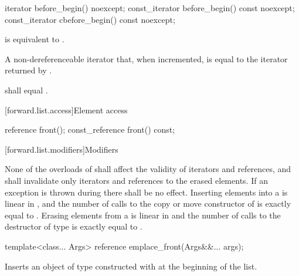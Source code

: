 %
%
\begin{itemdecl}
iterator before_begin() noexcept;
const_iterator before_begin() const noexcept;
const_iterator cbefore_begin() const noexcept;
\end{itemdecl}

\begin{itemdescr}
\pnum
\effects
{} is equivalent to
.

\pnum
\returns
A non-dereferenceable iterator that, when incremented, is equal to the iterator
returned by .

\pnum
\remarks
{} shall equal .
\end{itemdescr}

[forward.list.access]{Element access}

%
\begin{itemdecl}
reference front();
const_reference front() const;
\end{itemdecl}

\begin{itemdescr}
\pnum
\returns
{}
\end{itemdescr}

[forward.list.modifiers]{Modifiers}

\pnum
None of the overloads of  shall affect the validity of iterators and
references, and  shall invalidate only iterators and references to
the erased elements. If an exception is thrown during  there shall
be no effect. Inserting  elements into a  is linear in
, and the number of calls to the copy or move constructor of  is
exactly equal to . Erasing  elements from a  is
linear in  and the number of calls to the destructor of type  is
exactly equal to .

%
\begin{itemdecl}
template<class... Args> reference emplace_front(Args&&... args);
\end{itemdecl}

\begin{itemdescr}
\pnum
\effects
Inserts an object of type  constructed with
 at the beginning of the list.
\end{itemdescr}

